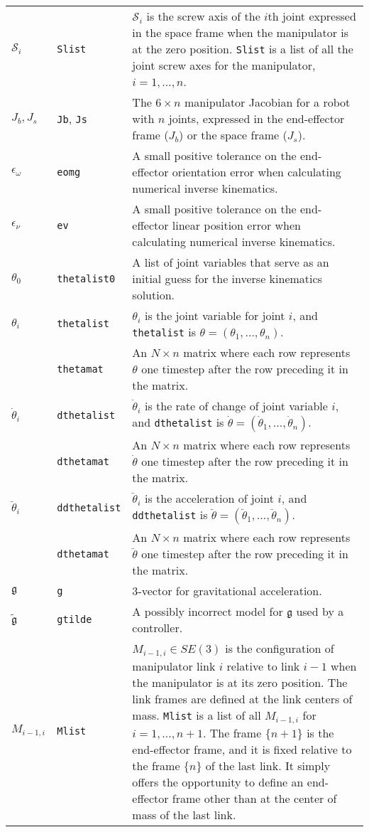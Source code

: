 \documentclass[11pt]{article}
\begin{document}
\begin{tabularx}{\linewidth}{llp{4.5in}}
$\mathcal{S}_i$ & {\tt Slist} & $\mathcal{S}_i$ is the screw axis of the $i$th joint expressed in the space frame when the manipulator is at the zero position.  {\tt Slist} is a list of all the joint screw axes for the manipulator,  $i = 1, \ldots, n$. \\
$J_b, J_s$ & {\tt Jb}, {\tt Js} & The $6 \times n$ manipulator Jacobian for a robot with $n$ joints, expressed in the end-effector frame ($J_b$) or the space frame ($J_s$). \\
${\epsilon}_{\omega}$ & {\tt eomg} & A small positive tolerance on the end-effector orientation error when calculating numerical inverse kinematics. \\
${\epsilon}_{\nu}$ & {\tt ev} & A small positive tolerance on the end-effector linear position error when calculating numerical inverse kinematics. \\
$\theta_0$ & {\tt thetalist0} & A list of joint variables that serve as an initial guess for the inverse kinematics solution.\\
$\theta_i$ & {\tt thetalist} & $\theta_i$ is the joint variable for joint $i$, and {\tt thetalist} is $\theta = (\theta_1, \ldots, \theta_n)$.\\
& {\tt thetamat} & An $N \times n$ matrix where each row represents $\theta$ one timestep after the row preceding it in the matrix. \\
$\dot{\theta}_i$ & {\tt dthetalist} & $\dot{\theta}_i$ is the rate of change of joint variable $i$, and {\tt dthetalist} is $\dot{\theta} = (\dot{\theta}_1, \ldots, \dot{\theta}_n)$. \\
& {\tt dthetamat} & An $N \times n$ matrix where each row represents $\dot{\theta}$ one timestep after the row preceding it in the matrix. \\
$\ddot{\theta}_i$ & {\tt ddthetalist} & $\ddot{\theta}_i$ is the acceleration of joint $i$, and {\tt ddthetalist} is $\ddot{\theta} = (\ddot{\theta}_1, \ldots, \ddot{\theta}_n)$. \\
& {\tt dthetamat} & An $N \times n$ matrix where each row represents $\ddot{\theta}$ one timestep after the row preceding it in the matrix. \\
$\mathfrak{g}$ & {\tt g} & $3$-vector for gravitational acceleration. \\
$\tilde{\mathfrak{g}}$ & {\tt gtilde} & A possibly incorrect model for $\mathfrak{g}$ used by a controller. \\
$M_{i-1,i} $ & {\tt Mlist} & $M_{i-1,i} \in SE(3)$ is the configuration of manipulator link $i$ relative to link $i-1$ when the manipulator is at its zero position.  The link frames are defined at the link centers of mass.  {\tt Mlist} is a list of all $M_{i-1,i}$ for $i = 1, \ldots, n+1$.  The frame $\{n+1\}$ is the end-effector frame, and it is fixed relative to the frame $\{n\}$ of the last link.  It simply offers the opportunity to define an end-effector frame other than at the center of mass of the last link. \\

\end{tabularx}
\end{document}
